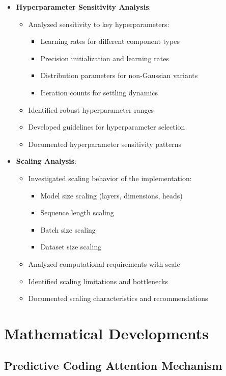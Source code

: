 \documentclass{article}
\begin{document}
\begin{itemize}
  \item \textbf{Hyperparameter Sensitivity Analysis}:
  \begin{itemize}
    \item Analyzed sensitivity to key hyperparameters:
    \begin{itemize}
      \item Learning rates for different component types
      \item Precision initialization and learning rates
      \item Distribution parameters for non-Gaussian variants
      \item Iteration counts for settling dynamics
    \end{itemize}
    \item Identified robust hyperparameter ranges
    \item Developed guidelines for hyperparameter selection
    \item Documented hyperparameter sensitivity patterns
  \end{itemize}

  \item \textbf{Scaling Analysis}:
  \begin{itemize}
    \item Investigated scaling behavior of the implementation:
    \begin{itemize}
      \item Model size scaling (layers, dimensions, heads)
      \item Sequence length scaling
      \item Batch size scaling
      \item Dataset size scaling
    \end{itemize}
    \item Analyzed computational requirements with scale
    \item Identified scaling limitations and bottlenecks
    \item Documented scaling characteristics and recommendations
  \end{itemize}
\end{itemize}

\section{Mathematical Developments}

\subsection{Predictive Coding Attention Mechanism}
\end{document}
